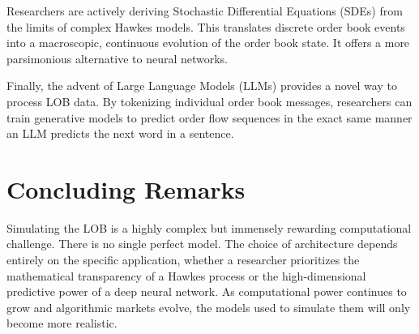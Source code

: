 Researchers are actively deriving Stochastic Differential Equations (SDEs) from the limits of complex Hawkes models. This translates discrete order book events into a macroscopic, continuous evolution of the order book state. It offers a more parsimonious alternative to neural networks.

Finally, the advent of Large Language Models (LLMs) provides a novel way to process LOB data. By tokenizing individual order book messages, researchers can train generative models to predict order flow sequences in the exact same manner an LLM predicts the next word in a sentence.

\section{Concluding Remarks}

Simulating the LOB is a highly complex but immensely rewarding computational challenge. There is no single perfect model. The choice of architecture depends entirely on the specific application, whether a researcher prioritizes the mathematical transparency of a Hawkes process or the high-dimensional predictive power of a deep neural network. As computational power continues to grow and algorithmic markets evolve, the models used to simulate them will only become more realistic.